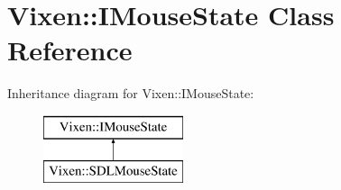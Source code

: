 \hypertarget{class_vixen_1_1_i_mouse_state}{}\section{Vixen\+:\+:I\+Mouse\+State Class Reference}
\label{class_vixen_1_1_i_mouse_state}
Inheritance diagram for Vixen\+:\+:I\+Mouse\+State\+:\begin{figure}[H]
\begin{center}
\leavevmode
\includegraphics[height=2.000000cm]{class_vixen_1_1_i_mouse_state}
\end{center}
\end{figure}
